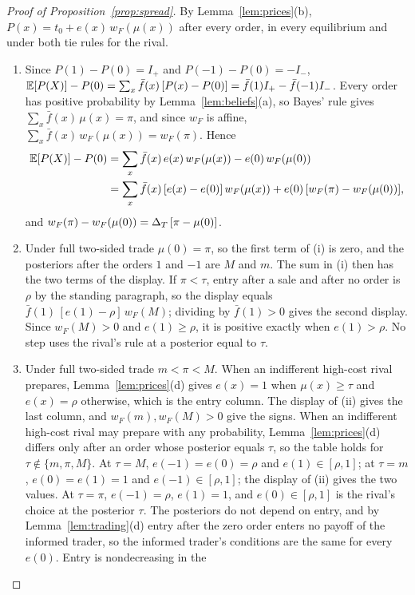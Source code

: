 \begin{proof}[Proof of Proposition~\ref{prop:spread}]
By Lemma~\ref{lem:prices}(b), \(P(x)=t_0+e(x)\,w_F(\mu(x))\) after every order, in every equilibrium and under both tie rules for the rival.
\begin{enumerate}[label=(\roman*),leftmargin=2em]
\item Since \(P(1)-P(0)=I_+\) and \(P(-1)-P(0)=-I_-\),
\(\mathbb{E}[P(X)]-P(0)=\sum_x\bar f(x)\,[P(x)-P(0)]=\bar f(1)I_+-\bar f(-1)I_-\). Every order has positive probability by
Lemma~\ref{lem:beliefs}(a), so Bayes' rule gives \(\sum_x\bar f(x)\,\mu(x)=\pi\), and since \(w_F\) is affine,
\(\sum_x\bar f(x)\,w_F(\mu(x))=w_F(\pi)\). Hence
\[
\begin{aligned}
\mathbb{E}[P(X)]-P(0)&=\sum_x\bar f(x)\,e(x)\,w_F(\mu(x))-e(0)\,w_F(\mu(0))\\
&=\sum_x\bar f(x)\,[e(x)-e(0)]\,w_F(\mu(x))+e(0)\,[w_F(\pi)-w_F(\mu(0))],
\end{aligned}
\]
and \(w_F(\pi)-w_F(\mu(0))=\Delta_T\,[\pi-\mu(0)]\).
\item Under full two-sided trade \(\mu(0)=\pi\), so the first term of (i) is zero, and the posteriors after the orders
\(1\) and \(-1\) are \(M\) and \(m\). The sum in (i) then has the two terms of the display. If \(\pi<\tau\), entry after
a sale and after no order is \(\rho\) by the standing paragraph, so the display equals \(\bar f(1)\,[e(1)-\rho]\,w_F(M)\);
dividing by \(\bar f(1)>0\) gives the second display. Since \(w_F(M)>0\) and \(e(1)\ge\rho\), it is positive exactly when
\(e(1)>\rho\). No step uses the rival's rule at a posterior equal to \(\tau\).
\item Under full two-sided trade \(m<\pi<M\). When an indifferent high-cost rival prepares,
Lemma~\ref{lem:prices}(d) gives \(e(x)=1\) when \(\mu(x)\ge\tau\) and \(e(x)=\rho\) otherwise, which is the entry column.
The display of (ii) gives the last column, and \(w_F(m),w_F(M)>0\) give the signs. When an indifferent high-cost
rival may prepare with any probability, Lemma~\ref{lem:prices}(d) differs only after an order whose posterior
equals \(\tau\), so the table holds for \(\tau\notin\{m,\pi,M\}\). At \(\tau=M\), \(e(-1)=e(0)=\rho\) and
\(e(1)\in[\rho,1]\); at \(\tau=m\), \(e(0)=e(1)=1\) and \(e(-1)\in[\rho,1]\); the display of (ii) gives the two values.
At \(\tau=\pi\), \(e(-1)=\rho\), \(e(1)=1\), and \(e(0)\in[\rho,1]\) is the rival's choice at the posterior \(\tau\).
The posteriors do not depend on entry, and by Lemma~\ref{lem:trading}(d) entry after the zero order enters no payoff
of the informed trader, so the informed trader's conditions are the same for every \(e(0)\). Entry is nondecreasing in the

\end{enumerate}
\end{proof}
